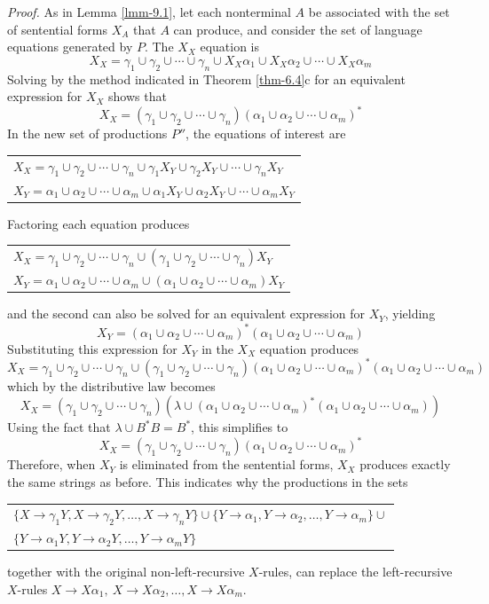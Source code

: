 \begin{lmm}
\emph{Proof.} As in Lemma \ref{lmm-9.1}, let each nonterminal $A$ be associated with the
set of sentential forms $X_A$ that $A$ can produce, and consider the set of
language equations generated by $P$. The $X_X$ equation is
\[ X_X = \gamma_1 \cup \gamma_2 \cup\cdots\cup \gamma_n \cup X_X\alpha_1 \cup
	X_X\alpha_2 \cup\cdots\cup X_X\alpha_m \]
Solving by the method indicated in Theorem \ref{thm-6.4}c for an equivalent expression
for $X_X$ shows that
\[ X_X = (\gamma_1\cup\gamma_2\cup\cdots\cup\gamma_n)(\alpha_1\cup\alpha_2\cup
	\cdots\cup\alpha_m)^* \]
In the new set of productions $P''$, the equations of interest are
\begin{center}\begin{tabular}{l}
$X_X = \gamma_1\cup\gamma_2\cup\cdots\cup\gamma_n\cup\gamma_1X_Y\cup\gamma_2X_Y
	\cup\cdots\cup\gamma_nX_Y$ \\
$X_Y = \alpha_1\cup\alpha_2\cup\cdots\cup\alpha_m\cup\alpha_1X_Y\cup\alpha_2X_Y
	\cup\cdots\cup\alpha_mX_Y$
\end{tabular}\end{center}
Factoring each equation produces
\begin{center}\begin{tabular}{l}
$X_X = \gamma_1\cup\gamma_2\cup\cdots\cup\gamma_n\cup(\gamma_1\cup\gamma_2\cup
	\cdots\cup\gamma_n)X_Y$ \\
$X_Y = \alpha_1\cup\alpha_2\cup\cdots\cup\alpha_m\cup(\alpha_1\cup\alpha_2\cup
	\cdots\cup\alpha_m)X_Y$
\end{tabular}\end{center}
and the second can also be solved for an equivalent expression for $X_Y$,
yielding
\[ X_Y = (\alpha_1\cup\alpha_2\cup\cdots\cup\alpha_m)^*(\alpha_1\cup\alpha_2\cup
	\cdots\cup\alpha_m) \]
Substituting this expression for $X_Y$ in the $X_X$ equation produces
\[ X_X = \gamma_1\cup\gamma_2\cup\cdots\cup\gamma_n\cup(\gamma_1\cup\gamma_2\cup\cdots
	\cup\gamma_n)(\alpha_1\cup\alpha_2\cup\cdots\cup\alpha_m)^*(\alpha_1\cup
	\alpha_2\cup\cdots\cup\alpha_m) \]
which by the distributive law becomes
\[ X_X = (\gamma_1\cup\gamma_2\cup\cdots\cup\gamma_n)(\lambda\cup(\alpha_1\cup
	\alpha_2\cup\cdots\cup\alpha_m)^*(\alpha_1\cup\alpha_2\cup\cdots\cup
	\alpha_m)) \]
Using the fact that $\lambda\cup B^*B = B^*$, this simplifies to
\[ X_X = (\gamma_1\cup\gamma_2\cup\cdots\cup\gamma_n)(\alpha_1\cup\alpha_2\cup
	\cdots\cup\alpha_m)^* \]
Therefore, when $X_Y$ is eliminated from the sentential forms, $X_X$ produces
exactly the same strings as before. This indicates why the productions in the
sets
\begin{center}\begin{tabular}{l}
$\{X\rightarrow \gamma_1Y,X\rightarrow\gamma_2Y,\ldots,X\rightarrow\gamma_nY\}
	\cup\{Y\rightarrow\alpha_1,Y\rightarrow\alpha_2,\ldots,Y\rightarrow
	\alpha_m\}\cup$ \\
$\{Y\rightarrow\alpha_1Y,Y\rightarrow\alpha_2Y,\ldots,Y\rightarrow\alpha_mY\}$
\end{tabular}\end{center}
together with the original non-left-recursive $X$-rules, can replace the
left-recursive $X$-rules $X\rightarrow X\alpha_1,\ X\rightarrow X\alpha_2,
\ldots,X\rightarrow X\alpha_m$.
\end{lmm}

